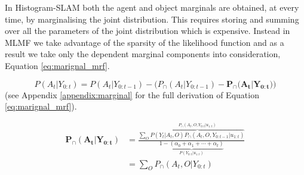 In Histogram-SLAM both the agent and object marginals are obtained, at every time, by marginalising the joint distribution.
This requires storing and summing over all the parameters of the joint distribution which is expensive.
Instead in MLMF we take advantage of the sparsity of the likelihood function and as a result we take only the dependent marginal components into consideration, 
Equation \ref{eq:marignal_mrf}. 

\begin{equation}
 P(A_t|Y_{0:t})  =  P(A_t|Y_{0:t-1}) - \Big(P_{\cap}(A_t|Y_{0:t-1}) -  \mathbf{P_{\cap}(A_t|Y_{0:t}})  \Big) \label{eq:marignal_mrf} 
\end{equation}
(see Appendix \ref{appendix:marginal} for the full derivation of Equation \ref{eq:marignal_mrf}).

\begin{align}\label{eq:marignal_mrf_2}
 \mathbf{P_{\cap}(A_t|Y_{0:t})} &= \frac{ \sum\limits_{O} \overbrace{ P(Y_t|A_{t},O) P_{\cap}(A_t,O,Y_{0:t-1}|u_{1:t})  }^{P_{\cap}(A_t,O,Y_{0:t}|u_{1:t})}}{\underbrace{1  - (\alpha_{0} + \alpha_{1} + \cdots + \alpha_{t})}_{P(Y_{0:t}|u_{1:t})}} \\
		       &= \sum\limits_{O} P_{\cap}(A_t,O|Y_{0:t})
\end{align}

